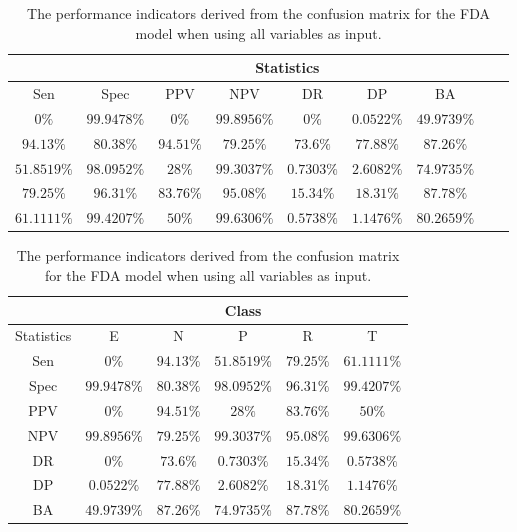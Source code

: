 \begin{table}[!ht]
	\centering
	\begin{tabular}{|c|c|c|c|c|c|c|c|c|}
		\hline
		 & \multicolumn{7}{c|}{Statistics} \\ \hline
		Sen & Spec & PPV & NPV & DR & DP & BA \\ \hline
		$0\%$ & $99.9478\%$ & $0\%$ & $99.8956\%$ & $0\%$ & $0.0522\%$ & $49.9739\%$ \\ \hline
		$94.13\%$ & $80.38\%$ & $94.51\%$ & $79.25\%$ & $73.6\%$ & $77.88\%$ & $87.26\%$ \\ \hline
		$51.8519\%$ & $98.0952\%$ & $28\%$ & $99.3037\%$ & $0.7303\%$ & $2.6082\%$ & $74.9735\%$ \\ \hline
		$79.25\%$ & $96.31\%$ & $83.76\%$ & $95.08\%$ & $15.34\%$ & $18.31\%$ & $87.78\%$ \\ \hline
		$61.1111\%$ & $99.4207\%$ & $50\%$ & $99.6306\%$ & $0.5738\%$ & $1.1476\%$ & $80.2659\%$ \\ \hline
	\end{tabular}
	\caption{The performance indicators derived from the confusion matrix for the FDA model when using all variables as input.}
	\label{tab:cs:all:fda}
\end{table}

\begin{table}[!ht]
	\centering
	\begin{tabular}{|c|c|c|c|c|c|}
		\hline
		 & \multicolumn{5}{c|}{Class} \\ \hline
		Statistics & E & N & P & R & T \\ \hline
		Sen & $0\%$ & $94.13\%$ & $51.8519\%$ & $79.25\%$ & $61.1111\%$ \\ \hline
		Spec & $99.9478\%$ & $80.38\%$ & $98.0952\%$ & $96.31\%$ & $99.4207\%$ \\ \hline
		PPV & $0\%$ & $94.51\%$ & $28\%$ & $83.76\%$ & $50\%$ \\ \hline
		NPV & $99.8956\%$ & $79.25\%$ & $99.3037\%$ & $95.08\%$ & $99.6306\%$ \\ \hline
		DR & $0\%$ & $73.6\%$ & $0.7303\%$ & $15.34\%$ & $0.5738\%$ \\ \hline
		DP & $0.0522\%$ & $77.88\%$ & $2.6082\%$ & $18.31\%$ & $1.1476\%$ \\ \hline
		BA & $49.9739\%$ & $87.26\%$ & $74.9735\%$ & $87.78\%$ & $80.2659\%$ \\ \hline
	\end{tabular}
	\caption{The performance indicators derived from the confusion matrix for the FDA model when using all variables as input.}
	\label{tab:cs:reverse:all:fda}
\end{table}

